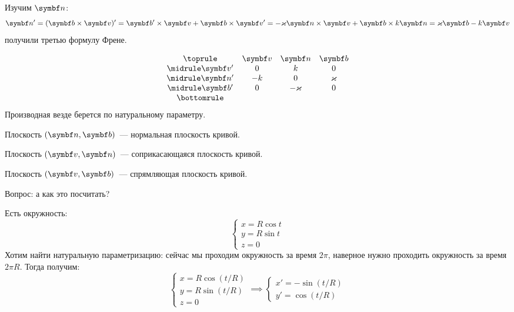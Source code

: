 \documentclass[main]{subfiles}
\begin{document}
Изучим $\vn$:
\[\vn' = (\vb \times \vv)' = \vb' \times \vv + \vb \times \vv' = -\kappa \vn \times \vv + \vb \times k\vn = \kappa\vb - k\vv\]
получили третью формулу Френе.
\begin{definition}
    \[
        \begin{array}{cccc}
            \toprule
                 & \vv & \vn     & \vb    \\ \midrule
            \vv' & 0   & k       & 0      \\ \midrule
            \vn' & -k  & 0       & \kappa \\ \midrule
            \vb' & 0   & -\kappa & 0      \\
            \bottomrule
        \end{array}
    \]
    Производная везде берется по натуральному параметру.
\end{definition}
\begin{definition}
    Плоскость $(\vn, \vb)$~--- нормальная плоскость кривой.
\end{definition}
\begin{definition}
    Плоскость $(\vv, \vn)$~--- соприкасающаяся плоскость кривой.
\end{definition}
\begin{definition}
    Плоскость $(\vv, \vb)$~--- спрямляющая плоскость кривой.
\end{definition}

Вопрос: а как это посчитать?
\begin{example}
    Есть окружность:
    \[\begin{cases}
            x = R \cos t \\
            y = R \sin t \\
            z = 0
        \end{cases}\]
    Хотим найти натуральную параметризацию:
    сейчас мы проходим окружность за время $2\pi$, наверное нужно проходить окружность за время $2\pi R$.
    Тогда получим:
    \[\begin{cases}
            x = R\cos (t/R)  \\
            y = R \sin (t/R) \\
            z = 0
        \end{cases}
        \implies
        \begin{cases}
            x' = - \sin (t/R) \\
            y' = \cos (t/R)
        \end{cases}\]
\end{example}
\end{document}

